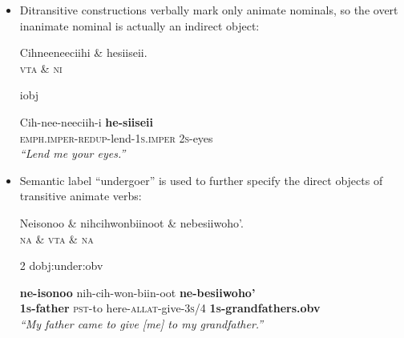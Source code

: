 \documentclass[portrait,a0paper,fontscale=0.36]{baposter} %
\begin{document}
\begin{poster}
{\begin{itemize}
\small
\begin{exe}
\ex \label{objct} %
\begin{dependency}
\begin{deptext}
niico'ontonounowoo \& nuhu' \& niinen.\\
\textsc{vti} \& \textsc{det} \& \textsc{ni}\\
\end{deptext}
	{1}	{dobj}
\end{dependency}
\gll nii-co'on-tonoun-owoo nuhu' \textbf{niinen}.\\
{\textsc{impf}-always-use-\textsc{1s}} this {piece of fat}\\
\trans \textit{``I always use this fat.''}
\end{exe}
\normalsize
\item Ditransitive constructions verbally mark only animate nominals, so the overt inanimate nominal is actually an indirect object: 

\small
\begin{exe}
\ex \label{objse} %
\begin{dependency}
\begin{deptext}
Cihneeneeciihi \& hesiiseii.\\
\textsc{vta} \& \textsc{ni} \\
\end{deptext}
	{iobj}
\end{dependency}
\gll Cih-nee-neeciih-i \textbf{he-siiseii}\\
{\textsc{emph.imper-redup}-lend-\textsc{1s.imper}} {\textsc{2s}-eyes}\\
\trans \textit{``Lend me your eyes.''}
\end{exe}
\normalsize
\item Semantic label ``undergoer'' is used to further specify the direct objects of transitive animate verbs: 

\footnotesize
\begin{exe}
\ex \label{under}
\begin{dependency}
\begin{deptext}
Neisonoo \& nihcihwonbiinoot \& nebesiiwoho'.\\
\textsc{na} \& \textsc{vta}	\& \textsc{na}\\
\end{deptext}
	{2}	{dobj:under:obv}
\end{dependency}
\begin{adjustwidth*}{-0.5in}{-0.5in}
\gll \textbf{ne-isonoo} {nih-cih-won-biin-oot} \textbf{ne-besiiwoho'} \\
\textbf{\textsc{1s}-father} {\textsc{pst}-to here-\textsc{allat}-give-\textsc{3s/4}} \textbf{\textsc{1s}-grandfathers.obv}\\
\trans \textit{``My father came to give [me] to my grandfather.''}
\end{adjustwidth*}
\end{exe}


\end{itemize}}
\end{poster}
\end{document}
